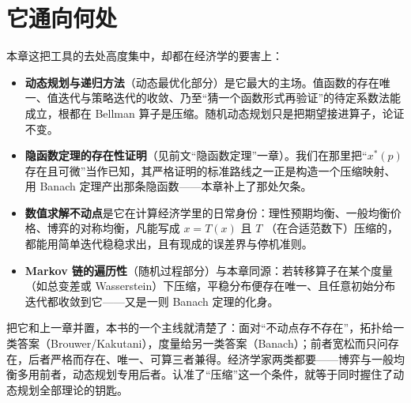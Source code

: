 
\section{它通向何处}
\label{sec:contraction-beyond}

本章这把工具的去处高度集中，却都在经济学的要害上：

\begin{itemize}
    \item \textbf{动态规划与递归方法}（动态最优化部分）是它最大的主场。值函数的存在唯一、值迭代与策略迭代的收敛、乃至``猜一个函数形式再验证''的待定系数法能成立，根都在 Bellman 算子是压缩。随机动态规划只是把期望接进算子，论证不变。
    \item \textbf{隐函数定理的存在性证明}（见前文``隐函数定理''一章）。我们在那里把``$x^*(p)$ 存在且可微''当作已知，其严格证明的标准路线之一正是构造一个压缩映射、用 Banach 定理产出那条隐函数——本章补上了那处欠条。
    \item \textbf{数值求解不动点}是它在计算经济学里的日常身份：理性预期均衡、一般均衡价格、博弈的对称均衡，凡能写成 $x=T(x)$ 且 $T$ （在合适范数下）压缩的，都能用简单迭代稳稳求出，且有现成的误差界与停机准则。
    \item \textbf{Markov 链的遍历性}（随机过程部分）与本章同源：若转移算子在某个度量（如总变差或 Wasserstein）下压缩，平稳分布便存在唯一、且任意初始分布迭代都收敛到它——又是一则 Banach 定理的化身。
\end{itemize}

把它和上一章并置，本书的一个主线就清楚了：面对``不动点存不存在''，拓扑给一类答案（Brouwer/Kakutani），度量给另一类答案（Banach）；前者宽松而只问存在，后者严格而存在、唯一、可算三者兼得。经济学家两类都要——博弈与一般均衡多用前者，动态规划专用后者。认准了``压缩''这一个条件，就等于同时握住了动态规划全部理论的钥匙。
